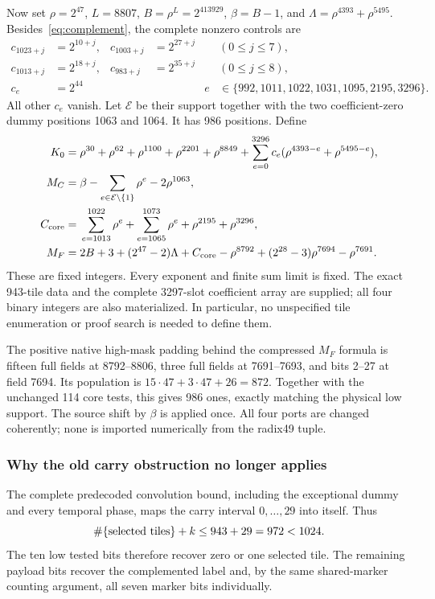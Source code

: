 Now set $\rho=2^{47}$, $L=8807$, $B=\rho^L=2^{413929}$,
$\beta=B-1$, and $\Lambda=\rho^{4393}+\rho^{5495}$.
Besides~\eqref{eq:complement}, the complete nonzero controls are
\begin{align*}
 c_{1023+j}&=2^{10+j},&c_{1003+j}&=2^{27+j}&&(0\le j\le7),\\
 c_{1013+j}&=2^{18+j},&c_{983+j}&=2^{35+j}&&(0\le j\le8),\\
 c_e&=2^{44}&&&
 e&\in\{992,1011,1022,1031,1095,2195,3296\}.
\end{align*}
All other $c_e$ vanish. Let $\mathcal E$ be their support together with
the two coefficient-zero dummy positions 1063 and 1064. It has 986
positions. Define
\begin{align*}
 K_0={}&\rho^{30}+\rho^{62}+\rho^{1100}+\rho^{2201}+\rho^{8849}
       +\sum_{e=0}^{3296}c_e(\rho^{4393-e}+\rho^{5495-e}),\\
 M_C={}&\beta-\sum_{e\in\mathcal E\setminus\{1\}}\rho^e-2\rho^{1063},\\
 C_{\rm core}={}&\sum_{e=1013}^{1022}\rho^e+
              \sum_{e=1065}^{1073}\rho^e+\rho^{2195}+\rho^{3296},\\
 M_F={}&2B+3+(2^{47}-2)\Lambda+C_{\rm core}-\rho^{8792}
                +(2^{28}-3)\rho^{7694}-\rho^{7691}.
\end{align*}
These are fixed integers. Every exponent and finite sum limit is fixed.
The exact 943-tile data and the complete 3297-slot coefficient array are
supplied; all four binary integers are also materialized. In particular,
no unspecified tile enumeration or proof search is needed to define them.

The positive native high-mask padding behind the compressed $M_F$ formula
is fifteen full fields at 8792--8806, three full fields at 7691--7693,
and bits 2--27 at field 7694. Its population is
$15\cdot47+3\cdot47+26=872$. Together with the unchanged 114 core
tests, this gives 986 ones, exactly matching the physical low support.
The source shift by $\beta$ is applied once. All four ports are changed
coherently; none is imported numerically from the radix49 tuple.

\subsubsection*{Why the old carry obstruction no longer applies}

The complete predecoded convolution bound, including the exceptional
dummy and every temporal phase, maps the carry interval $0,\ldots,29$
into itself. Thus
\[
 \#\{\hbox{selected tiles}\}+k\le943+29=972<1024.
\]
The ten low tested bits therefore recover zero or one selected tile.
The remaining payload bits recover the complemented label and, by the
same shared-marker counting argument, all seven marker bits individually.

